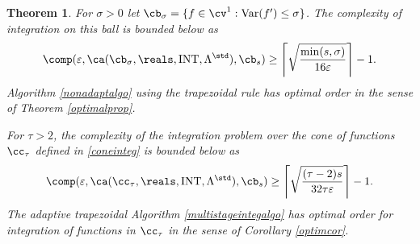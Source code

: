 \documentclass{iitthesis}
\DeclareMathOperator{\Var}{Var}
\DeclareMathOperator{\INT}{INT}
\newtheorem{theorem}{Theorem}
\theoremstyle{definition}
\theoremstyle{remark}
\begin{document}
\begin{theorem} \label{complowbdinteg} For $\sigma>0$ let $\cb_{\sigma}=\{f \in \cv^{1} : \Var(f') \le \sigma\}$.  The complexity of integration on this ball is bounded below as
\begin{equation*}
\comp(\varepsilon,\ca(\cb_{\sigma},\reals,\INT,\Lambda^{\std}),\cb_{s}) \ge \left \lceil \sqrt{\frac{\min(s,\sigma)}{16 \varepsilon}} \right \rceil -1 .
\end{equation*}
Algorithm \ref{nonadaptalgo} using the trapezoidal rule has optimal order in the sense of Theorem \ref{optimalprop}.

For $\tau>2$, the complexity of the integration problem over the cone of functions $\cc_{\tau}$ defined in \eqref{coneinteg} is bounded below as
\begin{equation*}
\comp(\varepsilon,\ca(\cc_{\tau},\reals,\INT,\Lambda^{\std}),\cb_{s}) \ge \left \lceil \sqrt{\frac{(\tau-2)s}{32 \tau \varepsilon}} \right \rceil -1 .
\end{equation*}
The adaptive trapezoidal Algorithm \ref{multistageintegalgo} has optimal order for integration of functions in $\cc_{\tau}$ in the sense of Corollary \ref{optimcor}.
\end{theorem}
\end{document}
